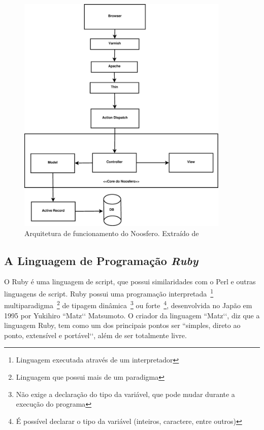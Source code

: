 \graphicspath{{figuras/}}
\begin{figure}[h]
\centering
\includegraphics[width=0.9\textwidth]{noosfero_architeture}
\caption[Arquitetura de funcionamento do Noosfero]{Arquitetura de funcionamento do Noosfero. Extraído de \cite{bucher2013rede}}
\label{fig:arquiteturanoosfero}
\end{figure}

\subsection{A Linguagem de Programação \textit{Ruby}}
\label{sec:linguagemruby}

O Ruby é uma linguagem de script, que possui similaridades com o Perl e outras linguagens de script. Ruby possui uma programação interpretada~\footnote{Linguagem executada através de um interpretador} multiparadigma~\footnote{Linguagem que possui mais de um paradigma} de tipagem dinâmica~\footnote{Não exige a declaração do tipo da variável, que pode mudar durante a execução do programa} ou forte~\footnote{É possível declarar o tipo da variável (inteiros, caractere, entre outros)}, desenvolvida no Japão em 1995 por Yukihiro ``Matz‘‘ Matsumoto. O criador da linguagem ``Matz‘‘, diz que a linguagem Ruby, tem como um dos principais pontos ser ``simples, direto ao ponto, extensível e portável‘‘, além de ser totalmente livre.

